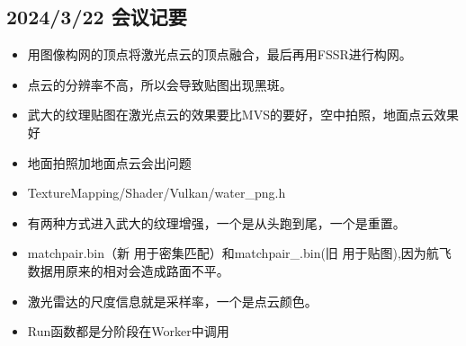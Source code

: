 \subsection{2024/3/22 会议记要}

\begin{itemize}
    \item 用图像构网的顶点将激光点云的顶点融合，最后再用FSSR进行构网。
    \item 点云的分辨率不高，所以会导致贴图出现黑斑。
    \item 武大的纹理贴图在激光点云的效果要比MVS的要好，空中拍照，地面点云效果好
    \item 地面拍照加地面点云会出问题
    \item TextureMapping/Shader/Vulkan/water_png.h
    \item 有两种方式进入武大的纹理增强，一个是从头跑到尾，一个是重置。
    \item matchpair.bin（新 用于密集匹配）和matchpair_.bin(旧 用于贴图),因为航飞数据用原来的相对会造成路面不平。
    \item 激光雷达的尺度信息就是采样率，一个是点云颜色。
    \item Run函数都是分阶段在Worker中调用
\end{itemize}